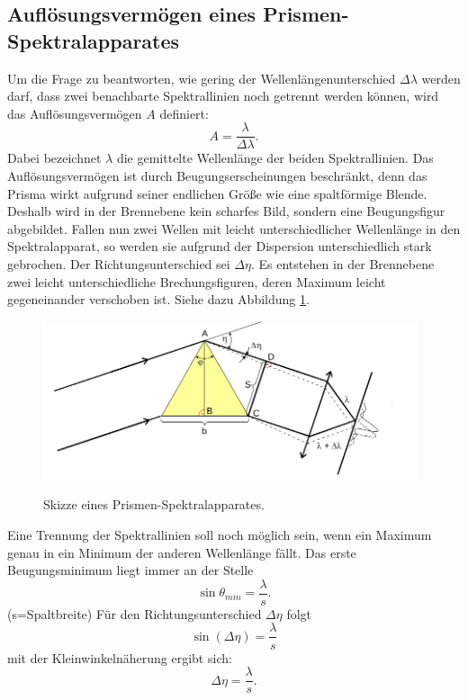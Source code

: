 \subsection{Auflösungsvermögen eines Prismen-Spektralapparates}
Um die Frage zu beantworten, wie gering der Wellenlängenunterschied $\Delta \lambda$
werden darf, dass zwei benachbarte Spektrallinien noch getrennt werden können,
wird das Auflösungsvermögen $A$ definiert:
\begin{equation}
  A=\frac{\lambda}{\Delta \lambda}.
  \label{eqn:auflösung}
\end{equation}
Dabei bezeichnet $\lambda$ die gemittelte Wellenlänge der beiden
Spektrallinien.
Das Auflösungsvermögen ist durch Beugungserscheinungen beschränkt, denn
das Prisma wirkt aufgrund seiner endlichen Größe wie eine
spaltförmige Blende. Deshalb wird in der Brennebene kein scharfes Bild, sondern
eine Beugungsfigur abgebildet.
Fallen nun zwei Wellen mit leicht unterschiedlicher Wellenlänge in den
Spektralapparat, so werden sie aufgrund der Dispersion unterschiedlich
stark gebrochen. Der Richtungsunterschied sei $\Delta \eta$.
Es entstehen in der Brennebene zwei leicht unterschiedliche Brechungsfiguren,
deren Maximum leicht gegeneinander verschoben ist. Siehe dazu Abbildung
\ref{fig:auflösung}.

\begin{figure}[H]
  \centering
  \includegraphics[width=11cm]{beug.png}
  \caption{Skizze eines Prismen-Spektralapparates.}
  \label{fig:auflösung}
  \cite{skript}
\end{figure}

Eine Trennung der Spektrallinien soll noch möglich sein, wenn ein Maximum
genau in ein Minimum der anderen Wellenlänge fällt.
Das erste Beugungsminimum liegt immer an der Stelle
\begin{equation}
  \sin{\theta_{min}}=\frac{\lambda}{s}.
\end{equation}
(s=Spaltbreite)
Für den Richtungsunterschied $\Delta\eta$ folgt
\begin{equation}
  \sin({\Delta\eta})=\frac{\lambda}{s}
  \label{eqn:sineta}
\end{equation}
mit der Kleinwinkelnäherung ergibt sich:
\begin{equation}
  \Delta \eta =\frac{\lambda}{s}.
  \label{eqn:deltaeta}
\end{equation}

